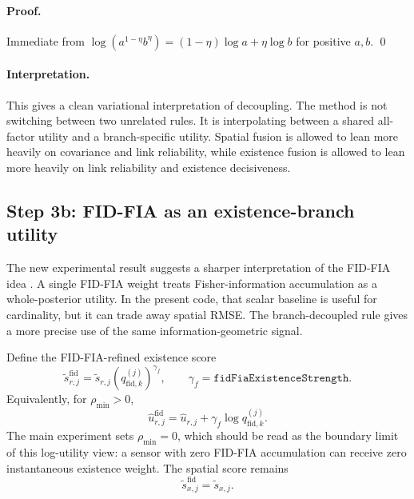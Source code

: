 \paragraph{Proof.}
Immediate from $\log(a^{1-\eta}b^\eta) = (1-\eta)\log a + \eta \log b$ for positive $a,b$. \qed

\paragraph{Interpretation.}
This gives a clean variational interpretation of decoupling. The method is not switching between two unrelated rules. It is interpolating between a shared all-factor utility and a branch-specific utility. Spatial fusion is allowed to lean more heavily on covariance and link reliability, while existence fusion is allowed to lean more heavily on link reliability and existence decisiveness.

\subsection*{Step 3b: FID-FIA as an existence-branch utility}

The new experimental result suggests a sharper interpretation of the FID-FIA idea \citep{CaoZhao2025InfoGeometryFusion}. A single FID-FIA weight treats Fisher-information accumulation as a whole-posterior utility. In the present code, that scalar baseline is useful for cardinality, but it can trade away spatial RMSE. The branch-decoupled rule gives a more precise use of the same information-geometric signal.

Define the FID-FIA-refined existence score
\begin{equation}
\tilde s_{r,j}^{\mathrm{fid}}
=
\tilde s_{r,j}
\left(q_{\mathrm{fid},k}^{(j)}\right)^{\gamma_f},
\qquad
\gamma_f = \texttt{fidFiaExistenceStrength}.
\end{equation}
Equivalently, for $\rho_{\min}>0$,
\begin{equation}
\hat u_{r,j}^{\mathrm{fid}}
=
\hat u_{r,j}
+\gamma_f\log q_{\mathrm{fid},k}^{(j)}.
\end{equation}
The main experiment sets $\rho_{\min}=0$, which should be read as the boundary limit of this log-utility view: a sensor with zero FID-FIA accumulation can receive zero instantaneous existence weight. The spatial score remains
\begin{equation}
\tilde s_{x,j}^{\mathrm{fid}}=\tilde s_{x,j}.
\end{equation}

